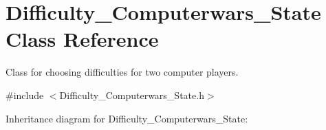 \hypertarget{classDifficulty__Computerwars__State}{}\section{Difficulty\+\_\+\+Computerwars\+\_\+\+State Class Reference}
\label{classDifficulty__Computerwars__State}


Class for choosing difficulties for two computer players.  




{\ttfamily \#include $<$Difficulty\+\_\+\+Computerwars\+\_\+\+State.\+h$>$}



Inheritance diagram for Difficulty\+\_\+\+Computerwars\+\_\+\+State\+:
